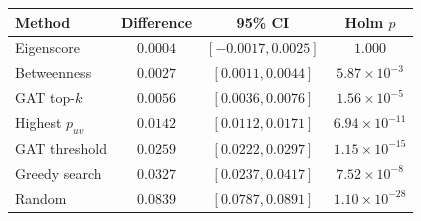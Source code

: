\begin{tabular}{lccc}
\toprule
Method & Difference & 95\% CI & Holm $p$ \\
\midrule
Eigenscore & $0.0004$ & $[-0.0017, 0.0025]$ & $1.000$ \\
Betweenness & $0.0027$ & $[0.0011, 0.0044]$ & $5.87\times10^{-3}$ \\
GAT top-$k$ & $0.0056$ & $[0.0036, 0.0076]$ & $1.56\times10^{-5}$ \\
Highest $p_{uv}$ & $0.0142$ & $[0.0112, 0.0171]$ & $6.94\times10^{-11}$ \\
GAT threshold & $0.0259$ & $[0.0222, 0.0297]$ & $1.15\times10^{-15}$ \\
Greedy search & $0.0327$ & $[0.0237, 0.0417]$ & $7.52\times10^{-8}$ \\
Random & $0.0839$ & $[0.0787, 0.0891]$ & $1.10\times10^{-28}$ \\
\bottomrule
\end{tabular}
